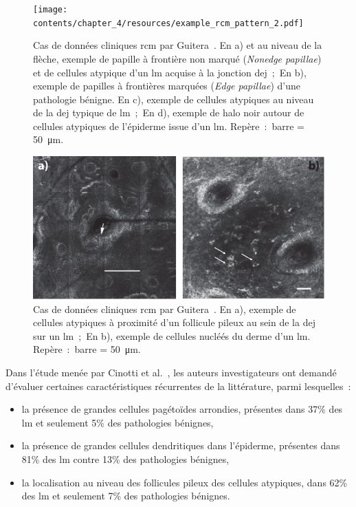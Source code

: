 \begin{figure}[H]
    \begin{center}
        \texttt{[image: contents/chapter\_4/resources/example\_rcm\_pattern\_2.pdf]}
        \caption{Cas de données cliniques \gls{rcm} par Guitera~\cite{Guitera2010}. En a) et au niveau de la flèche, exemple de papille à frontière non marqué (\textit{Nonedge papillae}) et de cellules atypique d'un \gls{lm} acquise à la jonction \gls{dej}~;~En b), exemple de papilles à frontières marquées (\textit{Edge papillae}) d'une pathologie bénigne. En c), exemple de cellules atypiques au niveau de la \gls{dej} typique de \gls{lm}~;~En d), exemple de halo noir autour de cellules atypiques de l'épiderme issue d'un \gls{lm}. Repère~:~barre = \SI{50}{\micro\metre}.}
        \label{fig:example_rcm_pattern_2}
    \end{center} 
\end{figure}\par

\begin{figure}[H]
    \begin{center}
        \includegraphics[width=0.8 \linewidth]{contents/chapter_4/resources/example_rcm_pattern_3.pdf}
        \caption{Cas de données cliniques \gls{rcm} par Guitera~\cite{Guitera2010}. En a), exemple de cellules atypiques à proximité d'un follicule pileux au sein de la \gls{dej} sur un \gls{lm}~;~En b), exemple de cellules nucléés du derme d'un \gls{lm}. Repère~:~barre = \SI{50}{\micro\metre}.}
        \label{fig:example_rcm_pattern_3}
    \end{center} 
\end{figure}\par

Dans l'étude menée par Cinotti et al.~\cite{Cinotti2018}, les auteurs investigateurs ont demandé d'évaluer certaines caractéristiques récurrentes de la littérature, parmi lesquelles~:
\begin{itemize}
    \item la présence de grandes cellules pagétoïdes arrondies, présentes dans 37\% des \gls{lm} et seulement 5\% des pathologies bénignes,
    \item la présence de grandes cellules dendritiques dans l'épiderme, présentes dans 81\% des \gls{lm} contre 13\% des pathologies bénignes,
    \item la localisation au niveau des follicules pileux des cellules atypiques, dans 62\% des \gls{lm} et seulement 7\% des pathologies bénignes.
\end{itemize}\par

